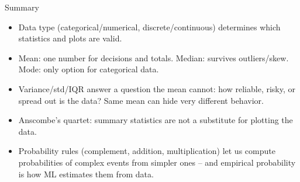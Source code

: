 \begin{frame}{Summary}
\begin{itemize}
  \item Data type (categorical/numerical, discrete/continuous) determines which statistics and plots are valid.
  \pause
  \item Mean: one number for decisions and totals. Median: survives outliers/skew. Mode: only option for categorical data.
  \pause
  \item Variance/std/IQR answer a question the mean cannot: how reliable, risky, or spread out is the data? Same mean can hide very different behavior.
  \pause
  \item Anscombe's quartet: summary statistics are not a substitute for plotting the data.
  \pause
  \item Probability rules (complement, addition, multiplication) let us compute probabilities of complex events from simpler ones -- and empirical probability is how ML estimates them from data.
\end{itemize}
\end{frame}
